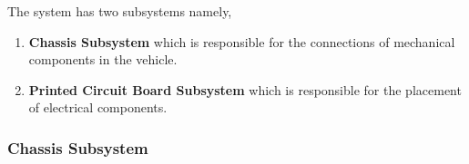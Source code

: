 \documentclass[a4paper,12pt]{article}
\begin{document}
	The system has two subsystems namely,
	
	\begin{enumerate}
		\item \textbf{Chassis Subsystem} which is responsible for the connections of mechanical components in the vehicle.
		\item \textbf{Printed Circuit Board Subsystem} which is responsible for the placement of electrical components.
	\end{enumerate}


\subsubsection{Chassis Subsystem}
\end{document}
